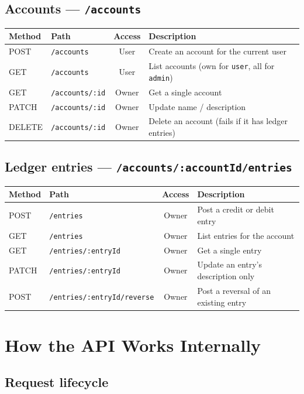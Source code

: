 \documentclass[11pt]{article}
\begin{document}
\subsection*{Accounts --- \texttt{/accounts}}

\begin{tabularx}{\textwidth}{@{}llcX@{}}
\toprule
Method & Path & Access & Description \\
\midrule
POST & \texttt{/accounts} & User & Create an account for the current user \\
GET & \texttt{/accounts} & User & List accounts (own for \texttt{user}, all for \texttt{admin}) \\
GET & \texttt{/accounts/:id} & Owner & Get a single account \\
PATCH & \texttt{/accounts/:id} & Owner & Update name / description \\
DELETE & \texttt{/accounts/:id} & Owner & Delete an account (fails if it has ledger entries) \\
\bottomrule
\end{tabularx}

\subsection*{Ledger entries --- \texttt{/accounts/:accountId/entries}}

\begin{tabularx}{\textwidth}{@{}llcX@{}}
\toprule
Method & Path & Access & Description \\
\midrule
POST & \texttt{/entries} & Owner & Post a credit or debit entry \\
GET & \texttt{/entries} & Owner & List entries for the account \\
GET & \texttt{/entries/:entryId} & Owner & Get a single entry \\
PATCH & \texttt{/entries/:entryId} & Owner & Update an entry's description only \\
POST & \texttt{/entries/:entryId/reverse} & Owner & Post a reversal of an existing entry \\
\bottomrule
\end{tabularx}

\section{How the API Works Internally}
\label{sec:api-internals}

\subsection{Request lifecycle}
\end{document}
